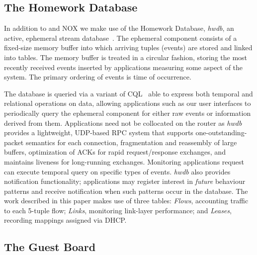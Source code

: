 \subsection{The Homework Database} \label{s:hwdb}
 
 
In addition to \ovs and NOX we make use of the Homework Database, \emph{hwdb},
an active, ephemeral stream
database~.  The
ephemeral component consists of a fixed-size memory buffer into which arriving
tuples (events) are stored and linked into tables.  The memory buffer is treated
in a circular fashion, storing the most recently received events inserted by
applications measuring some aspect of the system.  The primary ordering of
events is time of occurrence.  

The database is queried via a variant of CQL~ able to express
both temporal and relational operations on data, allowing applications such as
our user interfaces to periodically query the ephemeral component for either raw
events or information derived from them.  Applications need not be collocated on
the router as \emph{hwdb} provides a lightweight, UDP-based RPC system that
supports one-outstanding-packet semantics for each connection, fragmentation and
reassembly of large buffers, optimization of ACKs for rapid request/response
exchanges, and maintains liveness for long-running exchanges.  Monitoring
applications request can execute temporal query on specific types of events.
\emph{hwdb} also provides notification functionality; applications may register
interest in \emph{future} behaviour patterns and receive notification when such
patterns occur in the database.  The work described in this paper makes use of
three tables: \emph{Flows}, accounting traffic to each 5-tuple flow;
\emph{Links}, monitoring link-layer performance; and \emph{Leases}, recording
mappings assigned via DHCP.

\subsection{The Guest Board} \label{s:guest-board}


